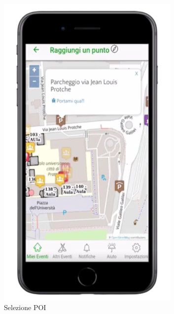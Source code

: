 \begin{figure}[h!]
    \caption{Selezione POI}
    \includegraphics[scale=0.2]{img/cap2/maps-1}
\end{figure}
\paragraph{}

